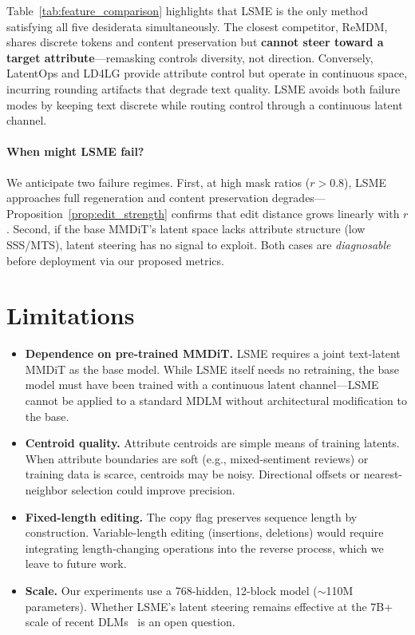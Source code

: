 \documentclass{article}
\begin{document}
Table~\ref{tab:feature_comparison} highlights that LSME is the only method satisfying all five desiderata simultaneously.
The closest competitor, ReMDM, shares discrete tokens and content preservation but \textbf{cannot steer toward a target attribute}---remasking controls diversity, not direction.
Conversely, LatentOps and LD4LG provide attribute control but operate in continuous space, incurring rounding artifacts that degrade text quality.
LSME avoids both failure modes by keeping text discrete while routing control through a continuous latent channel.

\paragraph{When might LSME fail?}
We anticipate two failure regimes.
First, at high mask ratios ($r > 0.8$), LSME approaches full regeneration and content preservation degrades---Proposition~\ref{prop:edit_strength} confirms that edit distance grows linearly with $r$.
Second, if the base MMDiT's latent space lacks attribute structure (low SSS/MTS), latent steering has no signal to exploit.
Both cases are \emph{diagnosable} before deployment via our proposed metrics.

\section{Limitations}
\label{sec:limitations}

\begin{itemize}
    \item \textbf{Dependence on pre-trained MMDiT.} LSME requires a joint text-latent MMDiT as the base model. While LSME itself needs no retraining, the base model must have been trained with a continuous latent channel---LSME cannot be applied to a standard MDLM without architectural modification to the base.
    \item \textbf{Centroid quality.} Attribute centroids are simple means of training latents. When attribute boundaries are soft (e.g., mixed-sentiment reviews) or training data is scarce, centroids may be noisy. Directional offsets or nearest-neighbor selection could improve precision.
    \item \textbf{Fixed-length editing.} The copy flag preserves sequence length by construction. Variable-length editing (insertions, deletions) would require integrating length-changing operations into the reverse process, which we leave to future work.
    \item \textbf{Scale.} Our experiments use a 768-hidden, 12-block model ($\sim$110M parameters). Whether LSME's latent steering remains effective at the 7B+ scale of recent DLMs~\citep{liu2025dream,nie2025llada} is an open question.
\end{itemize}
\end{document}
